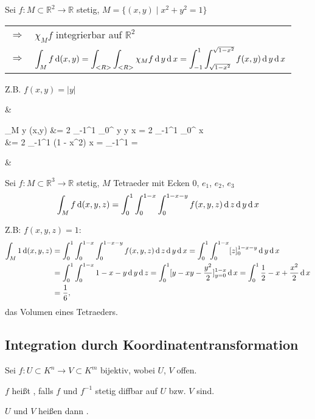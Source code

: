 \begin{example}
	Sei $f:M\subset\mathbb{R}^2\to\mathbb{R}$ stetig, $M=\{ (x,y) \mid x^2 + y^2 = 1\}$ \\
	\begin{tabularx}{\linewidth}{r@{\ \ }X}
		$\Rightarrow$ & $\chi_M f$ integrierbar auf $\mathbb{R}^2$ \\
		$\Rightarrow$ & $\displaystyle \int_M f \operatorname{d} (x,y) = \int_{<R>}\int_{<R>} \chi_M f \operatorname{d} y \operatorname{d} x = \int_{-1}^1 \int_{\sqrt{1 - x^2}}^{\sqrt{1 - x^2}} f(x,y) \operatorname{d} y \operatorname{d} x$
	\end{tabularx}

	Z.B. $f(x,y) = \vert y \vert$
	\zeroAmsmathAlignVSpaces*
	\begin{flalign*}
		\;\;& \begin{aligned} \Rightarrow\;\; \int_M \vert y \vert \D (x,y) &= 2 \int_{-1}^1 \int_0^{} y \D y \D x = 2 \int_{-1}^1 _0^{} \D x \\
		&= 2 \int_{-1}^1  (1 - x^2) \D x = _{-1}^1 = \end{aligned} &
	\end{flalign*}
\end{example}

\begin{example}
	Sei $f:M\subset\mathbb{R}^3\to\mathbb{R}$ stetig, $M$ Tetraeder mit Ecken $0$, $e_1$, $e_2$, $e_3$
	\begin{align*}
		\int_M f \operatorname{d} (x,y,z) = \int_0^1 \int_0^{1-x} \int_0^{1-x-y} f(x,y,z) \operatorname{d} z \operatorname{d} y \operatorname{d} x
	\end{align*}
	
	Z.B: $f(x,y,z) = 1$: \begin{align*}
		\int_M 1 \operatorname{d} (x,y,z) &= \int_0^1 \int_0^{1-x} \int_0^{1-x-y} f(x,y,z) \operatorname{d} z \operatorname{d} y \operatorname{d} x = \int_0^1 \int_0^{1-x} [z]_0^{1-x-y} \operatorname{d} y \operatorname{d} x \\
		&= \int_0^1 \int_0^{1-x} 1 - x - y \operatorname{d} y \operatorname{d} z = \int_0^1 [y - xy - \frac{y^2}{2}]_{y=0}^{1-x} \operatorname{d} x = \int_0^1 \frac{1}{2} - x + \frac{x^2}{2} \operatorname{d} x\\
		& = \frac{1}{6},
	\end{align*}
	das Volumen eines Tetraeders.
\end{example}

\subsection{Integration durch Koordinatentransformation}
\begin{*definition}
Sei $f:U\subset K^n\to V\subset K^m$ bijektiv, wobei $U$, $V$ offen.

$f$ heißt , falls $f$ und $f^{-1}$ stetig \gls{diffbar} auf $U$ bzw. $V$ sind.

$U$ und $V$ heißen dann .
\end{*definition}

